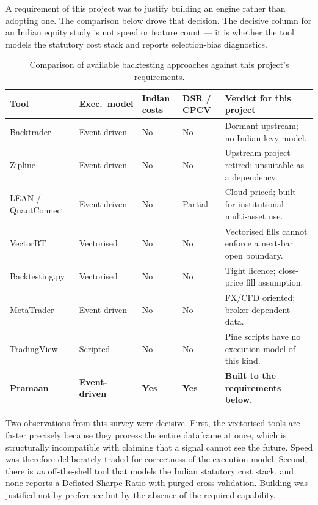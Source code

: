 \documentclass[12pt,a4paper,oneside]{report}
\begin{document}
A requirement of this project was to justify building an engine rather than
adopting one. The comparison below drove that decision. The decisive column for
an Indian equity study is not speed or feature count --- it is whether the tool
models the statutory cost stack and reports selection-bias diagnostics.

\begin{table}[h]
\centering
\caption[Backtesting Approaches Comparison]{Comparison of available backtesting approaches against this project's requirements.}
\label{tab:competitors}
\begin{tabular}{@{}p{3.1cm}p{2.1cm}p{2.0cm}p{2.0cm}>{\raggedright\arraybackslash}p{3.2cm}@{}}
\toprule
\textbf{Tool} & \textbf{Exec.\ model} & \textbf{Indian costs} & \textbf{DSR / CPCV} & \textbf{Verdict for this project} \\
\midrule
Backtrader & Event-driven & No & No & Dormant upstream; no Indian levy model. \\
Zipline & Event-driven & No & No & Upstream project retired; unsuitable as a dependency. \\
LEAN / QuantConnect & Event-driven & No & Partial & Cloud-priced; built for institutional multi-asset use. \\
VectorBT & Vectorised & No & No & Vectorised fills cannot enforce a next-bar open boundary. \\
Backtesting.py & Vectorised & No & No & Tight licence; close-price fill assumption. \\
MetaTrader & Event-driven & No & No & FX/CFD oriented; broker-dependent data. \\
TradingView & Scripted & No & No & Pine scripts have no execution model of this kind. \\
\midrule
\textbf{Pramaan} & \textbf{Event-driven} & \textbf{Yes} & \textbf{Yes} & \textbf{Built to the requirements below.} \\
\bottomrule
\end{tabular}
\end{table}

Two observations from this survey were decisive. First, the vectorised tools are
faster precisely because they process the entire dataframe at once, which is
structurally incompatible with claiming that a signal cannot see the future.
Speed was therefore deliberately traded for correctness of the execution model.
Second, there is \emph{no} off-the-shelf tool that models the Indian statutory
cost stack, and none reports a Deflated Sharpe Ratio with purged
cross-validation. Building was justified not by preference but by the absence of
the required capability.
\end{document}
